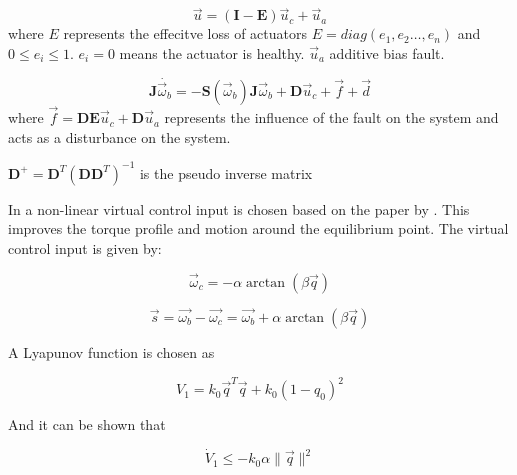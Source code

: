 \begin{equation}\vec{u}=(\mathbf{I}-\mathbf{E})\vec{u}_{c}+\vec{u}_{a}\end{equation}
where $E$ represents the effecitve loss of actuators $E=diag(e_{1},e_{2}\dots,e_{n})$ and $0\leq e_{i}\leq 1$. $e_{i}=0$ means the actuator is healthy. $\vec{u}_{a}$ additive bias fault.


\begin{equation}
    \mathbf{J}\dot{\vec{\omega}_{b}}=-\mathbf{S}(\vec{\omega}_{b})\mathbf{J}\vec{\omega}_{b}+\mathbf{D}\vec{u}_{c}+\vec{f}+\vec{d}
\end{equation} 
where $\vec{f}=\mathbf{D}\mathbf{E}\vec{u}_{c}+\mathbf{D}\vec{u}_{a}$ represents the influence of the fault on the system and acts as a disturbance on the system.



$\mathbf{D}^+=\mathbf{D}^T(\mathbf{D}\mathbf{D}^T)^{-1}$ is the pseudo inverse matrix

In \cite{shenActiveFaulttolerantControl2019} a non-linear virtual control input is chosen based on the paper by \cite{kimRobustBacksteppingControl2003}. This improves the torque profile and motion around the equilibrium point. The virtual control input is given by:

\begin{equation}\vec{\omega}_{c}=-\alpha\arctan(\beta\vec{q})\end{equation}

\begin{equation}\vec{s}=\vec{\omega_{b}}-\vec{\omega_{c}}=\vec{\omega_{b}}+\alpha\arctan(\beta\vec{q})\end{equation}

A Lyapunov function is chosen as 

\begin{equation}V_{1}=k_{0}\vec{q}^T\vec{q}+k_{0}(1-q_{0})^2\end{equation}

And it can be shown that 



\begin{equation}\dot{V}_{1}\leq-k_{0}\alpha \lVert \vec{q} \rVert^{2}\end{equation}


